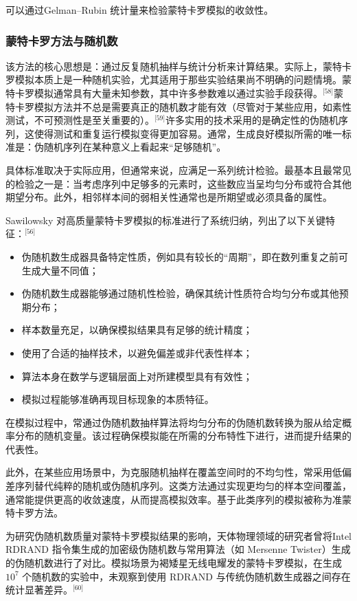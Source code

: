 可以通过Gelman–Rubin 统计量来检验蒙特卡罗模拟的收敛性。
\subsubsection{蒙特卡罗方法与随机数}
该方法的核心思想是：通过反复随机抽样与统计分析来计算结果。实际上，蒙特卡罗模拟本质上是一种随机实验，尤其适用于那些实验结果尚不明确的问题情境。蒙特卡罗模拟通常具有大量未知参数，其中许多参数难以通过实验手段获得。\(^\text{[58]}\)蒙特卡罗模拟方法并不总是需要真正的随机数才能有效（尽管对于某些应用，如素性测试，不可预测性是至关重要的）。\(^\text{[59]}\)许多实用的技术采用的是确定性的伪随机序列，这使得测试和重复运行模拟变得更加容易。通常，生成良好模拟所需的唯一标准是：伪随机序列在某种意义上看起来“足够随机”。

具体标准取决于实际应用，但通常来说，应满足一系列统计检验。最基本且最常见的检验之一是：当考虑序列中足够多的元素时，这些数应当呈均匀分布或符合其他期望分布。此外，相邻样本间的弱相关性通常也是所期望或必须具备的属性。

Sawilowsky 对高质量蒙特卡罗模拟的标准进行了系统归纳，列出了以下关键特征：\(^\text{[56]}\)
\begin{itemize}
\item 伪随机数生成器具备特定性质，例如具有较长的“周期”，即在数列重复之前可生成大量不同值；
\item 伪随机数生成器能够通过随机性检验，确保其统计性质符合均匀分布或其他预期分布；
\item 样本数量充足，以确保模拟结果具有足够的统计精度；
\item 使用了合适的抽样技术，以避免偏差或非代表性样本；
\item 算法本身在数学与逻辑层面上对所建模型具有有效性；
\item 模拟过程能够准确再现目标现象的本质特征。
\end{itemize}
在模拟过程中，常通过伪随机数抽样算法将均匀分布的伪随机数转换为服从给定概率分布的随机变量。该过程确保模拟能在所需的分布特性下进行，进而提升结果的代表性。

此外，在某些应用场景中，为克服随机抽样在覆盖空间时的不均匀性，常采用低偏差序列替代纯粹的随机或伪随机序列。这类方法通过实现更均匀的样本空间覆盖，通常能提供更高的收敛速度，从而提高模拟效率。基于此类序列的模拟被称为准蒙特卡罗方法。

为研究伪随机数质量对蒙特卡罗模拟结果的影响，天体物理领域的研究者曾将Intel RDRAND 指令集生成的加密级伪随机数与常用算法（如 Mersenne Twister）生成的伪随机数进行了对比。模拟场景为褐矮星无线电耀发的蒙特卡罗模拟，在生成 $10^7$ 个随机数的实验中，未观察到使用 RDRAND 与传统伪随机数生成器之间存在统计显著差异。\(^\text{[60]}\)
